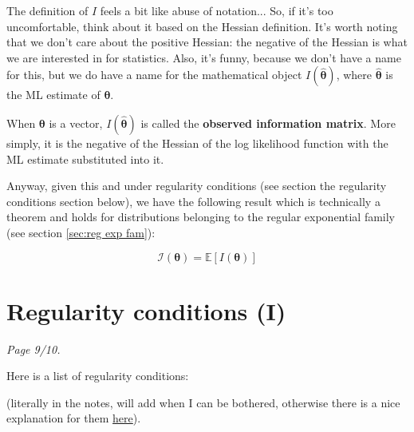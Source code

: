 The definition of \(I\) feels a bit like abuse of notation... 
So, if it's too uncomfortable, think about it based on the Hessian definition. 
It's worth noting that we don't care about the positive Hessian: the negative of the Hessian is what we are interested in for statistics. 
Also, it's funny, because we don't have a name for this, but we do have a name for the mathematical object \(I(\hat{\bm{\theta}})\), where \(\hat{\bm{\theta}}\) is the ML estimate of \(\bm{\theta}\).

\begin{definition}\label{defn:observed information matrix - multi}
    When \(\bm{\theta}\) is a vector, \(I(\hat{\bm{\theta}})\) is called the \textbf{observed information matrix}. 
    More simply, it is the negative of the Hessian of the log likelihood function with the ML estimate substituted into it. 
\end{definition}

Anyway, given this and under regularity conditions (see section the regularity conditions section below), we have the following result which is technically a theorem and holds for distributions belonging to the regular exponential family (see section \ref{sec:reg exp fam}):

\begin{equation}\label{eq:thm about expected info as the expectation of I}
    \mathscr{I}(\bm{\theta}) = \mathbb{E}[I(\bm{\theta})]
\end{equation}




\section{Regularity conditions (I)}\label{sec:reg conds I}

\textit{Page 9/10.}

\bigskip

Here is a list of regularity conditions:

(literally in the notes, will add when I can be bothered, otherwise there is a nice explanation for them \href{https://stats.stackexchange.com/questions/101520/what-are-the-regularity-conditions-for-likelihood-ratio-test}{here}).

